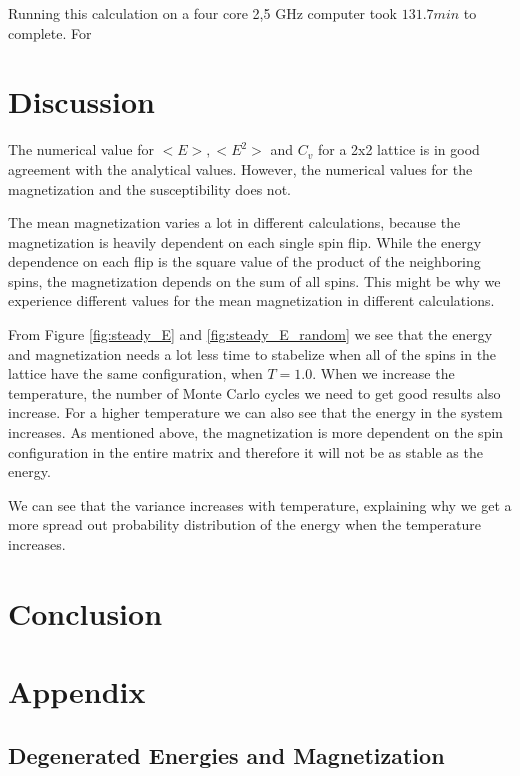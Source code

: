 \documentclass{article}
\begin{document}
{{		Running this calculation on a four core 2,5 GHz computer took $131.7 min$ to complete. For 


\section{Discussion}


	The numerical value for $<E>, <E^2>$ and $C_v$ for a 2x2 lattice is in good agreement with the analytical values. However, the numerical values for the magnetization and the susceptibility does not.

	The mean magnetization varies a lot in different calculations, because the magnetization is heavily dependent on each single spin flip. While the energy dependence on each flip is the square value of the product of the neighboring spins, the magnetization depends on the sum of all spins. This might be why we experience different values for the mean magnetization in different calculations.

	From Figure \ref{fig:steady_E} and \ref{fig:steady_E_random} we see that the energy and magnetization needs a lot less time to stabelize when all of the spins in the lattice have the same configuration, when $T = 1.0$. When we increase the temperature, the number of Monte Carlo cycles we need to get good results also increase. For a higher temperature we can also see that the energy in the system increases. As mentioned above, the magnetization is more dependent on the spin configuration in the entire matrix and therefore it will not be as stable as the energy.


	We can see that the variance increases with temperature, explaining why we get a more spread out probability distribution of the energy when the temperature increases.

\section{Conclusion}


\section{Appendix}
	\subsection{Degenerated Energies and Magnetization}

}}
\end{document}
